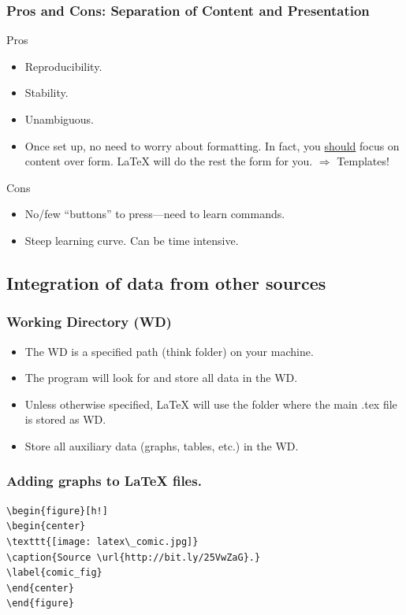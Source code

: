 \documentclass{beamer} %
\begin{document}
\begin{frame}
\frametitle{Pros and Cons: Separation of Content and Presentation}
\begin{block}{Pros}%
\begin{itemize}
\item Reproducibility.
\item Stability.
\item Unambiguous.
\item Once set up, no need to worry about formatting. In fact, you \underline{should} focus on content over form. {\LaTeX} will do the rest the form for you. $\Longrightarrow$ Templates!
\end{itemize}
\end{block}
\begin{block}{Cons}%
\begin{itemize}
\item No/few ``buttons'' to press---need to learn commands.
\item Steep learning curve. Can be time intensive.
\end{itemize}
\end{block}
\end{frame} 
 
\subsection{Integration of data from other sources}

\begin{frame}
\frametitle{Working Directory (WD)}
\begin{itemize}
\item The WD is a specified path (think folder) on your machine.
\item The program will look for and store all data in the WD.
\item Unless otherwise specified, {\LaTeX} will use the folder where the main .tex file is stored as WD.
\item Store all auxiliary data (graphs, tables, etc.) in the WD.
\end{itemize}
\end{frame}

\begin{frame}[fragile=singleslide]
\frametitle{Adding graphs to {\LaTeX} files.}
\begin{Verbatim}
\begin{figure}[h!] 
\begin{center}
\texttt{[image: latex\_comic.jpg]}
\caption{Source \url{http://bit.ly/25VwZaG}.}
\label{comic_fig}
\end{center}
\end{figure}
\end{Verbatim}
\end{frame}
\end{document}
